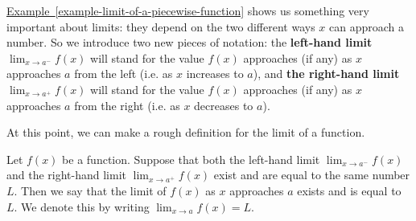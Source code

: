 \documentclass[10pt,]{book}
\newcommand{\terminology}[1]{\textbf{#1}}
\theoremstyle{ptxplainnotitle}
\theoremstyle{ptxplaintitle}
\theoremstyle{ptxplainnotitle}
\theoremstyle{ptxplaintitle}
\theoremstyle{ptxplainnotitle}
\theoremstyle{ptxplaintitle}
\theoremstyle{ptxdefinitionnotitle}
\theoremstyle{ptxdefinitiontitle}
\theoremstyle{ptxdefinitionnotitle}
\theoremstyle{ptxdefinitiontitle}
\theoremstyle{ptxdefinitionnotitle}
\theoremstyle{ptxdefinitiontitle}
\theoremstyle{ptxdefinitionnotitle}
\theoremstyle{ptxdefinitiontitle}
\theoremstyle{ptxdefinitionnotitle}
\theoremstyle{ptxdefinitiontitle}
\numberwithin{equation}{section}
\begin{document}
\hypertarget{p-13}{}%
\hyperref[example-limit-of-a-piecewise-function]{Example~\ref{example-limit-of-a-piecewise-function}} shows us something very important about limits: they depend on the two different ways \(x\) can approach a number. So we introduce two new pieces of notation: the \terminology{left-hand limit} \(\lim_{x\to a^{-}}f(x)\) will stand for the value \(f(x)\) approaches (if any) as \(x\) approaches \(a\) from the left (i.e. as \(x\) increases to \(a\)), and \terminology{the right-hand limit} \(\lim_{x\to a^{+}}f(x)\) will stand for the value \(f(x)\) approaches (if any) as \(x\) approaches \(a\) from the right (i.e. as \(x\) decreases to \(a\)).%
\par
\hypertarget{p-14}{}%
At this point, we can make a rough definition for the limit of a function.%
\begin{definition}\label{definition-limit-of-a-function}
\hypertarget{p-15}{}%
Let \(f(x)\) be a function. Suppose that both the left-hand limit \(\lim_{x\to a^{-}}f(x)\) and the right-hand limit \(\lim_{x\to a^{+}}f(x)\) exist and are equal to the same number \(L\). Then we say that the limit of \(f(x)\) as \(x\) approaches \(a\) exists and is equal to \(L\). We denote this by writing \(\lim_{x\to a}f(x) = L\).%
\end{definition}
\end{document}
